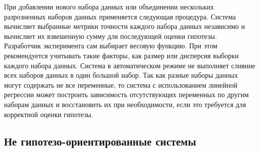 При добавлении нового набора данных или объединении нескольких разрозненных наборов данных применяется следующая 
процедура. Система вычисляет выбранные метрики точности каждого набора данных независимо и вычисляет их взвешенную 
сумму для последующей оценки гипотезы. Разработчик эксперимента сам выбирает весовую функцию. При этом рекомендуется 
учитывать такие факторы, как размер или дисперсия выборки каждого набора данных. Система в автоматическом режиме не 
выполняет слияние всех наборов данных в один большой набор. Так как разные наборы данных могут содержать не все 
переменные, то система с использованием линейной регрессии может построить зависимость отсутствующих переменных по 
другим наборам данных и восстановить их при необходимости, если это требуется для корректной оценки гипотезы.

\subsection{Не гипотезо-ориентированные системы}\label{sect1_3_4}


